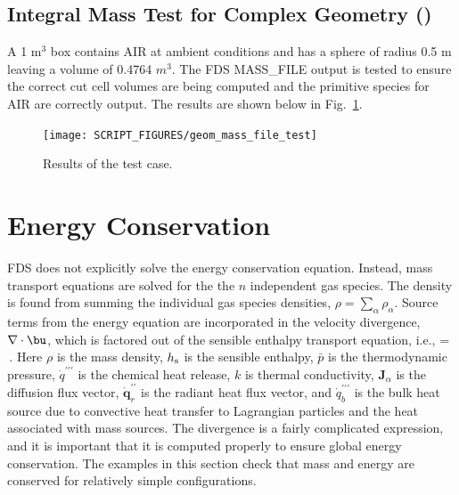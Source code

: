 \documentclass[11pt]{book}
\begin{document}
\subsection{Integral Mass Test for Complex Geometry (\texorpdfstring{}{geom\_mass\_file\_test})}
\label{geom_mass_file_test}

A 1 m$^3$ box contains AIR at ambient conditions and has a sphere of radius 0.5 m leaving a volume of 0.4764 $m^3$.  The FDS {\ct MASS\_FILE} output is tested to ensure the correct cut cell volumes are being computed and the primitive species for AIR are correctly output.  The results are shown below in Fig.~\ref{fig:geom_mass_file_test}.

\begin{figure}[ht]
\centering
\texttt{[image: SCRIPT\_FIGURES/geom\_mass\_file\_test]}
\caption[The  test case]{Results of the  test case.}
\label{fig:geom_mass_file_test}
\end{figure}

\section{Energy Conservation}

FDS does not explicitly solve the energy conservation equation. Instead, mass transport equations are solved for the the $n$ independent gas species.  The density is found from summing the individual gas species densities, $\rho = \sum_\alpha \rho_\alpha$. Source terms from the energy equation are incorporated in the velocity  divergence, $\nabla \cdot \bu$, which is factored out of the sensible enthalpy transport equation, i.e.,
\be
\label{eqn_new_div}
\nabla\cdot{} =   \,\mbox{.}
\ee
Here $\rho$ is the mass density, $h_{\rm s}$ is the sensible enthalpy, $\bar{p}$ is the thermodynamic pressure, $\dot{q}^{\prime\prime\prime}$ is the chemical heat release, $k$ is thermal conductivity, $\mathbf{J}_\alpha$ is the diffusion flux vector, $\dot{\mathbf{q}}_r^{\prime\prime}$ is the radiant heat flux vector, and $\dot{q}_b^{\prime\prime\prime}$ is the bulk heat source due to convective heat transfer to Lagrangian particles and the heat associated with mass sources. The divergence is a fairly complicated expression, and it is important that it is computed properly to ensure global energy conservation. The examples in this section check that mass and energy are conserved for relatively simple configurations.
\end{document}
